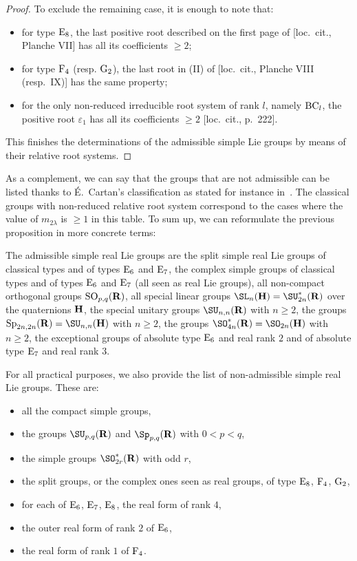 \begin{proof}
To exclude the remaining case, it is enough to note that:
\begin{itemize}
\item for type ${\rm E}_8$, the last positive root described on the first page of [loc.~cit., Planche VII] has all its coefficients $\geqslant 2$;
\item for type ${\rm F}_4$ (resp. ${\rm G}_2$), the last root in (II) of [loc.~cit., Planche VIII (resp.~IX)] has the same property;
\item for the only non-reduced irreducible root system of rank $l$, namely ${\rm BC}_l$, the positive root $\varepsilon_1$ has all its coefficients $\geqslant 2$ [loc.~cit., p.~222].
\end{itemize}
This finishes the determinations of the admissible simple Lie groups by means of their relative root systems.
\end{proof}

As a complement, we can say that the groups that are not admissible can be listed thanks to É.~Cartan's classification as stated for instance in~\cite[Table~VI, pp.~532--534]{Helgason}. The classical groups with non-reduced relative root system correspond to the cases where the value of $m_{2\lambda}$ is $\geqslant 1$ in this table. To sum up, we can reformulate the previous proposition in more concrete terms:

\begin{prop}
The admissible simple real Lie groups are the split simple real Lie groups of classical types and of types ${\rm E}_6$ and ${\rm E}_7$, the complex simple groups of classical types and of types ${\rm E}_6$ and ${\rm E}_7$ (all seen as real Lie groups), all non-compact orthogonal groups ${\rm SO}_{p,q}({\bf R})$, all special linear groups ${\SL}_n({\bf H}) = {\SU}^*_{2n}({\bf R})$ over the quaternions ${\bf H}$, the special unitary groups ${\SU}_{n,n}({\bf R})$ with $n \geqslant 2$, the groups ${\rm Sp}_{2n,2n}({\bf R}) = {\SU}_{n,n}({\bf H})$ with $n \geqslant 2$, the groups ${\SO}^*_{4n}({\bf R})={\SO}_{2n} ({\bf H})$ with $n \geqslant 2$, the exceptional groups of absolute type ${\rm E}_6$ and real rank $2$ and of absolute type ${\rm E}_7$ and real rank $3$.
\end{prop}

For all practical purposes, we also provide the list of non-admissible simple real Lie groups. These are:
\begin{itemize}
\item all the compact simple groups,
\item the groups ${\SU}_{p,q}({\bf R})$ and ${\Sp}_{p,q}({\bf R})$ with $0<p<q$,
\item the simple groups ${\SO}^*_{2r}({\bf R})$ with odd $r$,
\item the split groups, or the complex ones seen as real groups, of type ${\rm E}_8$, ${\rm F}_4$, ${\rm G}_2$,
\item for each of ${\rm E}_6$, ${\rm E}_7$, ${\rm E}_8$, the real form of rank $4$,
\item the outer real form of rank $2$ of ${\rm E}_6$,
\item the real form of rank $1$ of ${\rm F}_4$.
\end{itemize}

